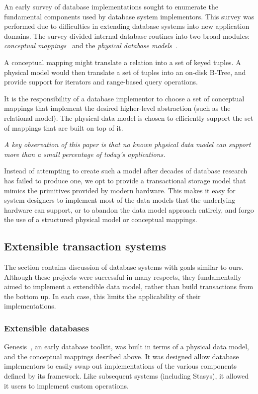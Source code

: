 \documentclass[letterpaper,twocolumn,10pt]{article}
\newcommand{\yad}{Stasys\xspace}
\begin{document}
An early survey of database implementations sought to enumerate the
fundamental components used by database system implementors.  This
survey was performed due to difficulties in extending database systems
into new application domains.  The survey divided internal database
routines into two broad modules: {\em conceptual
mappings}~\cite{batoryConceptual} and the {\em physical
database models}~\cite{batoryPhysical}.

A conceptual mapping might translate a relation into a set of keyed
tuples.  A physical model would then translate a set of tuples into an
on-disk B-Tree, and provide support for iterators and range-based query
operations.

It is the responsibility of a database implementor to choose a set of
conceptual mappings that implement the desired higher-level
abstraction (such as the relational model).  The physical data model
is chosen to efficiently support the set of mappings that are built on
top of it.

{\em A key observation of this paper is that no known physical data model
can support more than a small percentage of today's applications.}

Instead of attempting to create such a model after decades of database
research has failed to produce one, we opt to provide a transactional
storage model that mimics the primitives provided by modern hardware.
This makes it easy for system designers to implement most of the data
models that the underlying hardware can support, or to
abandon the data model approach entirely, and forgo the use of a
structured physical model or conceptual mappings.

\subsection{Extensible transaction systems} 

The section contains discussion of database systems with goals similar to ours.
Although these projects were
successful in many respects, they fundamentally aimed to implement a
extendible data model, rather than build transactions from the bottom up.
In each case, this limits the applicability of their implementations.

\subsubsection{Extensible databases}

Genesis~\cite{genesis}, an early database toolkit, was built in terms
of a physical data model, and the conceptual mappings desribed above.
It was designed allow database implementors to easily swap out
implementations of the various components defined by its framework.
Like subsequent systems (including \yad), it allowed it users to
implement custom operations.
\end{document}
